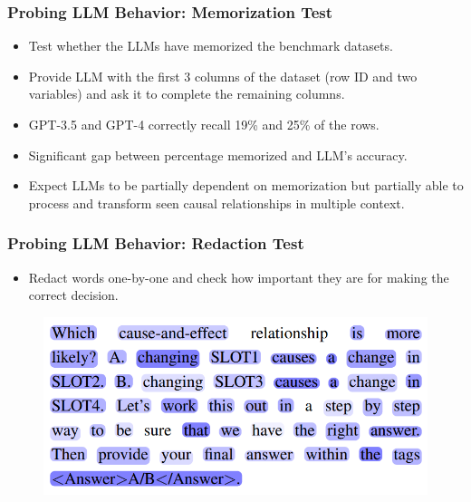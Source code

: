 \documentclass{beamer}
\begin{document}
\begin{frame}
	\frametitle{Probing LLM Behavior: Memorization Test}
	\begin{itemize}
		\item Test whether the LLMs have memorized the benchmark datasets.
		\item Provide LLM with the first 3 columns of the dataset
			(row ID and two variables) and ask it to complete the
			remaining columns.
		\item GPT-3.5 and GPT-4 correctly recall 19\% and
			25\% of the rows. 
		\item Significant gap between percentage memorized and LLM's
			accuracy.
		\item Expect LLMs to be partially dependent on memorization but
			partially able to process and transform seen causal
			relationships in multiple context.
	\end{itemize}
\end{frame}

\begin{frame}
	\frametitle{Probing LLM Behavior: Redaction Test}
	\begin{itemize}
		\item Redact words one-by-one and check how important they are for making the correct decision.
	\end{itemize}
	\begin{figure}
		\centering
		\includegraphics[scale=0.4]{imgs/figure4.png}
	\end{figure}
\end{frame}
\end{document}
